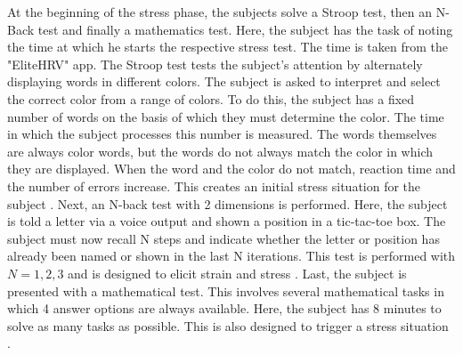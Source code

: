 At the beginning of the stress phase, the subjects solve a Stroop test, then an N-Back test and finally a mathematics test. 
Here, the subject has the task of noting the time at which he starts the respective stress test.
The time is taken from the "EliteHRV" app.
The Stroop test tests the subject's attention by alternately displaying words in different colors. 
The subject is asked to interpret and select the correct color from a range of colors.
To do this, the subject has a fixed number of words on the basis of which they must determine the color. 
The time in which the subject processes this number is measured.
The words themselves are always color words, but the words do not always match the color in which they are displayed.
When the word and the color do not match, reaction time and the number of errors increase. 
This creates an initial stress situation for the subject \cite{StroopCompetitionSocialEvaluative}. 
Next, an N-back test with 2 dimensions is performed. 
Here, the subject is told a letter via a voice output and shown a position in a tic-tac-toe box. 
The subject must now recall N steps and indicate whether the letter or position has already been named or shown in the last N iterations. 
This test is performed with $N={1,2,3}$ and is designed to elicit strain and stress \cite{liangEffectAcuteStress2023}.
Last, the subject is presented with a mathematical test. 
This involves several mathematical tasks in which 4 answer options are always available.
Here, the subject has 8 minutes to solve as many tasks as possible. 
This is also designed to trigger a stress situation \cite{caviolaStressTimePressure2017}.

